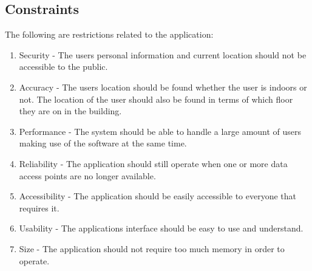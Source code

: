 \documentclass[11pt, a4paper]{article}
\begin{document}
	\subsection{Constraints}
	The following are restrictions related to the application:
		\begin{enumerate}
				\renewcommand{\labelenumi}{{\textbf{\arabic{enumi}.}}}
				\item Security  - The users personal information and current location should not be accessible to the public.
				\item Accuracy - The users location should be found whether the user is indoors or not. The location of the user should also be found in terms of which floor they are on in the building.
				\item Performance - The system should be able to handle a large amount of users making use of the software at the same time.
				\item Reliability - The application should still operate when one or more data access points are no longer available.
				\item Accessibility - The application should be easily accessible to everyone that requires it.
				\item Usability - The applications interface should be easy to use and understand.
				\item Size - The application should not require too much memory in order to operate.
				\end{enumerate}
\end{document}
